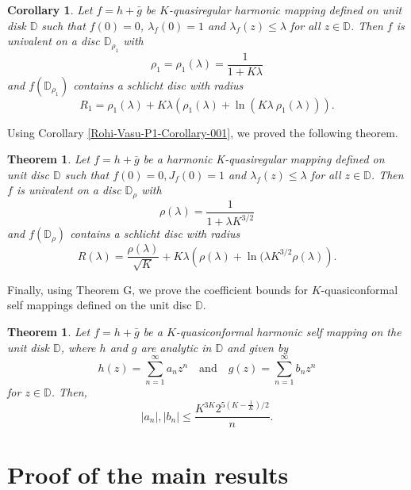 \documentclass[a4paper,12pt]{amsart}
\theoremstyle{plain}
\newtheorem{thm}[equation]{Theorem}
\newtheorem{cor}[equation]{Corollary}
\theoremstyle{definition}
\begin{document}
\begin{cor}\label{Rohi-Vasu-P1-Corollary-002}
  Let $f=h+\bar{g}$ be  $K$-quasiregular  harmonic mapping defined on unit disk $\mathbb{D}$ such that $f(0)=0$, $\lambda_f(0)=1$ and $\lambda_f(z) \leq \lambda$ for all $z \in \mathbb{D}$. Then $f$ is univalent on a disc $\mathbb{D}_{\rho_1}$ with
$$
\rho_1=\rho_1(\lambda)=\frac{1}{1+K \lambda}
$$
and $f\left(\mathbb{D}_{\rho_1}\right)$ contains a schlicht disc with radius
$$
R_1=\rho_1(\lambda)+K \lambda \left(\rho_1(\lambda)+\ln \left(K \lambda 
 \ \rho_1(\lambda)\right)\right).
$$
\end{cor}
Using Corollary \ref{Rohi-Vasu-P1-Corollary-001}, we proved the following theorem.
\begin{thm}\label{Rohi-Vasu-P1-Theorem-003}
 Let $f=h+\bar{g}$ be a harmonic K-quasiregular mapping defined on unit disc $\mathbb{D}$ such that $f(0)=0, J_f(0)=1$ and $\lambda_f{(z)} \leq \lambda$ for all $z \in \mathbb{D}$. Then $f$ is univalent on a disc $\mathbb{D}_\rho$ with $$\rho(\lambda)=\frac{1}{1+\lambda K^{3 / 2}}$$
and $f\left(\mathbb{D}_\rho\right)$ contains a schlicht disc with radius $$R(\lambda)=\frac{\rho(\lambda)}{\sqrt{K}}+K \lambda\left(\rho(\lambda)+\ln (\lambda K^{3 / 2} \rho(\lambda)\right)
.$$
\end{thm}
\vspace{1mm}
Finally, using Theorem G, we prove the coefficient bounds for $K$-quasiconformal self mappings defined on the unit disc $\mathbb{D}$.

\begin{thm}\label{Rohi-Vasu-P1-Theorem-004}
 Let $f=h+\bar{g}$ be a $K$-quasiconformal harmonic self mapping on the unit disk $\mathbb{D}$, where $h$ and $g$ are analytic in $\mathbb{D}$ and given by
$$
h(z)=\sum_{n=1}^{\infty} a_n z^n \quad \text{and}
\quad g(z)=\sum_{n=1}^{\infty} b_n z^n $$ for $z \in \mathbb{D}$.
Then,
$$
\left|a_n\right|,\left|b_n\right| \leq \frac{K^{3 K} 2^{5\left(K-\frac{1}{K}\right) / 2}}{n}.
$$
\end{thm}

\section{Proof of the main results}
\end{document}
